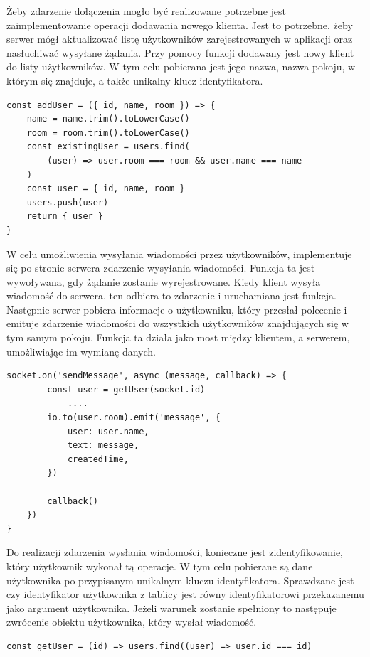 Żeby zdarzenie dołączenia mogło być realizowane potrzebne jest zaimplementowanie operacji dodawania nowego klienta. Jest to potrzebne, żeby serwer mógł aktualizować listę użytkowników zarejestrowanych w aplikacji oraz nasłuchiwać wysyłane żądania. Przy pomocy funkcji dodawany jest nowy klient do listy użytkowników. W tym celu pobierana jest jego nazwa, nazwa pokoju, w którym się znajduje, a także unikalny klucz identyfikatora.
\begin{lstlisting}[caption=Implementacja funkcji dodawania uzytkownika]
const addUser = ({ id, name, room }) => {
    name = name.trim().toLowerCase()
    room = room.trim().toLowerCase()
    const existingUser = users.find(
        (user) => user.room === room && user.name === name
    )
    const user = { id, name, room }
    users.push(user)
    return { user }
}
\end{lstlisting}
W celu umożliwienia wysyłania wiadomości przez użytkowników, implementuje się po stronie serwera zdarzenie wysyłania wiadomości. Funkcja ta jest wywoływana, gdy żądanie zostanie wyrejestrowane. Kiedy klient wysyła wiadomość do serwera, ten odbiera to zdarzenie i uruchamiana jest funkcja. Następnie serwer pobiera informacje o użytkowniku, który przesłał polecenie i emituje zdarzenie wiadomości do wszystkich użytkowników znajdujących się w tym samym pokoju. Funkcja ta działa jako most między klientem, a serwerem, umożliwiając im wymianę danych.
\begin{lstlisting}[caption=Implementacja zdarzenia wysylania wiadomosci]
socket.on('sendMessage', async (message, callback) => {
        const user = getUser(socket.id)
        	....
        io.to(user.room).emit('message', {
            user: user.name,
            text: message,
            createdTime,
        })

        callback()
    })
}
\end{lstlisting}
Do realizacji zdarzenia wysłania wiadomości, konieczne jest zidentyfikowanie, który użytkownik wykonał tą operacje. W tym celu pobierane są dane użytkownika po przypisanym unikalnym kluczu identyfikatora. Sprawdzane jest czy identyfikator użytkownika z tablicy jest równy identyfikatorowi przekazanemu jako argument użytkownika. Jeżeli warunek zostanie spełniony to następuje zwrócenie obiektu użytkownika, który wysłał wiadomość.
\begin{lstlisting}[caption=Implementacja funkcji pobierania informacji o uzytkowniku]
const getUser = (id) => users.find((user) => user.id === id)
\end{lstlisting}

